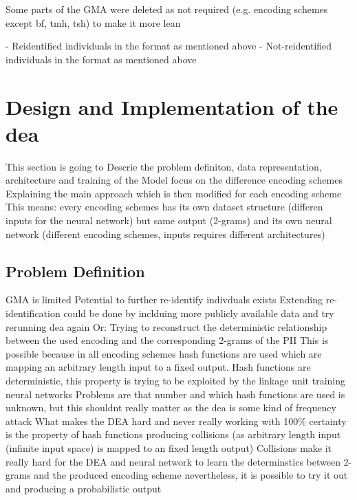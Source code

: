 Some parts of the GMA were deleted as not required (e.g. encoding schemes except bf, tmh, tsh) to make it more lean

- Reidentified individuals in the format as mentioned above
- Not-reidentified individuals in the format as mentioned above

\section{Design and Implementation of the \ac{dea}} \label{sec:designandimplementation}

This section is going to Descrie the problem definiton, data representation, architecture and training of the Model
focus on the difference encoding schemes
Explaining the main approach which is then modified for each encoding scheme
This means: every encoding schemes has its own dataset structure (differen inputs for the neural network) but same output (2-grams) and its own neural network (different encoding schemes, inputs requires different architectures)

\subsection{Problem Definition} \label{sec:problemdefinition}
GMA is limited
Potential to further re-identify indivduals exists
Extending re-identification could be done by inclduing more publicly available data and try rerunning dea again
Or:
Trying to reconstruct the deterministic relationship between the used encoding and the corresponding 2-grams of the PII
This is possible because in all encoding schemes hash functions are used which are mapping an arbitrary length input to a fixed output.
Hash functions are deterministic, this property is trying to be exploited by the linkage unit training neural networks
Problems are that number and which hash functions are used is unknown, but this shouldnt really matter as the dea is some kind of frequency attack
What makes the DEA hard and never really working with 100\% certainty is the property of hash functions producing collisions (as arbitrary length input (infinite input space) is mapped to an fixed length output)
Collisions make it really hard for the DEA and neural network to learn the determinstics between 2-grams and the produced encoding scheme
nevertheless, it is possible to try it out and producing a probabilistic output

